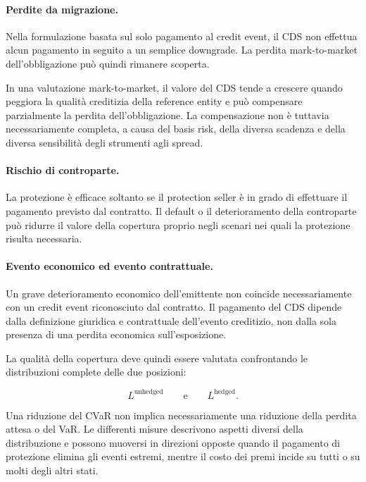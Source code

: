 \paragraph{Perdite da migrazione.}

Nella formulazione basata sul solo pagamento al credit event, il CDS
non effettua alcun pagamento in seguito a un semplice downgrade. La
perdita mark-to-market dell'obbligazione pu\`{o} quindi rimanere
scoperta.

In una valutazione mark-to-market, il valore del CDS tende a crescere
quando peggiora la qualit\`{a} creditizia della reference entity e
pu\`{o} compensare parzialmente la perdita dell'obbligazione. La
compensazione non \`{e} tuttavia necessariamente completa, a causa del
basis risk, della diversa scadenza e della diversa sensibilit\`{a}
degli strumenti agli spread.

\paragraph{Rischio di controparte.}

La protezione \`{e} efficace soltanto se il protection seller \`{e} in
grado di effettuare il pagamento previsto dal contratto. Il default o
il deterioramento della controparte pu\`{o} ridurre il valore della
copertura proprio negli scenari nei quali la protezione risulta
necessaria.

\paragraph{Evento economico ed evento contrattuale.}

Un grave deterioramento economico dell'emittente non coincide
necessariamente con un credit event riconosciuto dal contratto. Il
pagamento del CDS dipende dalla definizione giuridica e contrattuale
dell'evento creditizio, non dalla sola presenza di una perdita
economica sull'esposizione.

La qualit\`{a} della copertura deve quindi essere valutata confrontando
le distribuzioni complete delle due posizioni:

\[
L^{\mathrm{unhedged}}
\qquad
\text{e}
\qquad
L^{\mathrm{hedged}}.
\]

Una riduzione del CVaR non implica necessariamente una riduzione della
perdita attesa o del VaR. Le differenti misure descrivono aspetti
diversi della distribuzione e possono muoversi in direzioni opposte
quando il pagamento di protezione elimina gli eventi estremi, mentre
il costo dei premi incide su tutti o su molti degli altri stati.

